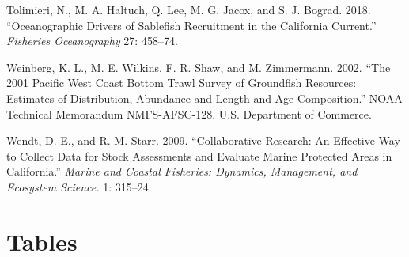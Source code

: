 \documentclass[11pt,
  english,
  a4paper,
]{article}
\begin{document}
\begin{cslreferences}
\leavevmode\hypertarget{ref-tolimieri2018}{}%
Tolimieri, N., M. A. Haltuch, Q. Lee, M. G. Jacox, and S. J. Bograd. 2018. ``Oceanographic Drivers of Sablefish Recruitment in the California Current.'' \emph{Fisheries Oceanography} 27: 458--74.

\leavevmode\hypertarget{ref-weinberg_2001_2002}{}%
Weinberg, K. L., M. E. Wilkins, F. R. Shaw, and M. Zimmermann. 2002. ``The 2001 Pacific West Coast Bottom Trawl Survey of Groundfish Resources: Estimates of Distribution, Abundance and Length and Age Composition.'' NOAA Technical Memorandum NMFS-AFSC-128. U.S. Department of Commerce.

\leavevmode\hypertarget{ref-Wendt2009}{}%
Wendt, D. E., and R. M. Starr. 2009. ``Collaborative Research: An Effective Way to Collect Data for Stock Assessments and Evaluate Marine Protected Areas in California.'' \emph{Marine and Coastal Fisheries: Dynamics, Management, and Ecosystem Science.} 1: 315--24.
\end{cslreferences}

\leavevmode\tagmcend\tagstructend

\clearpage


\hypertarget{tables}{%
\section{Tables}\label{tables}}

\leavevmode\tagmcend\tagstructend

\begingroup\fontsize{10}{12}\selectfont
\begingroup\fontsize{10}{12}\selectfont
\end{document}
